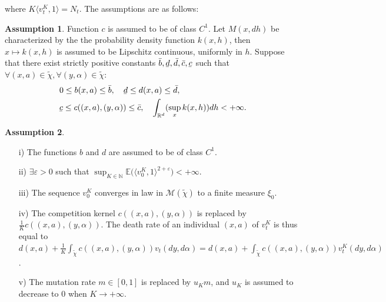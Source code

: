 \documentclass[11pt, a4paper]{article}
\newcommand{\ubar}[1]{\underaccent{\bar}{#1}}
\theoremstyle{definition}
\newtheorem{assumption}{Assumption}
\begin{document}
    \noindent where $K\langle v_t^K,1 \rangle = N_t$. The assumptions are as follows:

    \begin{assumption}\label{ass1}
        Function $c$ is assumed to be of class $C^1$. Let $M(x,dh)$ be characterized by the the probability density function $k(x,h)$, then $x\mapsto k(x,h)$ is assumed to be Lipschitz continuous, uniformly in $h$. Suppose that there exist strictly positive constants $\bar{b}, \ubar{d}, \bar{d}, \bar{c}, \ubar{c}$ such that $\forall (x,a) \in \tilde{\chi},\forall (y,\alpha) \in \tilde{\chi}$:
        \begin{align*}
            &0 \leq b(x,a) \leq \bar{b},\quad \ubar{d} \leq d(x,a) \leq \bar{d}, \\
            &\ubar{c} \leq c((x,a),(y,\alpha)) \leq \bar{c},\quad \int_{\mathbb{R}^d}(\sup_x k(x,h))dh < +\infty.
        \end{align*}
    \end{assumption}

    \begin{assumption}\label{ass2}
        \begin{itemize}
            \item[i)] The functions $b$ and $d$ are assumed to be of class $C^1$.
            \item[ii)] $\exists \varepsilon > 0$ such that $\sup_{K\in \mathbb{N}} \mathbb{E} \big( \langle v_0^K,1 \rangle ^{2+\varepsilon} \big) < +\infty$.
            \item[iii)] The sequence $v_0^K$ converges in law in $\mathcal{M}(\tilde{\chi})$ to a finite measure $\xi_0$.
            \item[iv)] The competition kernel $c((x,a),(y,\alpha))$ is replaced by $\frac{1}{K} c((x,a),(y,\alpha))$. The death rate of an individual $(x,a)$ of $v_t^K$ is thus equal to $d(x,a) + \frac{1}{K} \int_{\tilde{\chi}} c((x,a),(y,\alpha))v_t(dy,d\alpha) = d(x,a) + \int_{\tilde{\chi}} c((x,a),(y,\alpha))v_t^K(dy,d\alpha)$.
            \item[v)] The mutation rate $m\in [0,1]$ is replaced by $u_K m$, and $u_K$ is assumed to decrease to $0$ when $K\rightarrow +\infty$.
        \end{itemize}
    \end{assumption}
\end{document}
